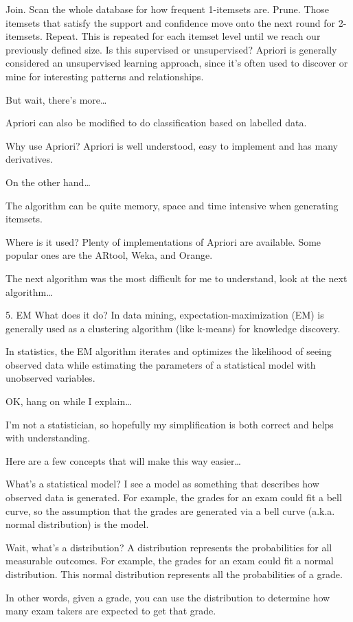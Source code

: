Join. Scan the whole database for how frequent 1-itemsets are.
Prune. Those itemsets that satisfy the support and confidence move onto the next round for 2-itemsets.
Repeat. This is repeated for each itemset level until we reach our previously defined size.
Is this supervised or unsupervised? Apriori is generally considered an unsupervised learning approach, since it’s often used to discover or mine for interesting patterns and relationships.

But wait, there’s more…

Apriori can also be modified to do classification based on labelled data.

Why use Apriori? Apriori is well understood, easy to implement and has many derivatives.

On the other hand…

The algorithm can be quite memory, space and time intensive when generating itemsets.

Where is it used? Plenty of implementations of Apriori are available. Some popular ones are the ARtool, Weka, and Orange.

The next algorithm was the most difficult for me to understand, look at the next algorithm…

5. EM
What does it do? In data mining, expectation-maximization (EM) is generally used as a clustering algorithm (like k-means) for knowledge discovery.

In statistics, the EM algorithm iterates and optimizes the likelihood of seeing observed data while estimating the parameters of a statistical model with unobserved variables.

OK, hang on while I explain…

I’m not a statistician, so hopefully my simplification is both correct and helps with understanding.

Here are a few concepts that will make this way easier…

What’s a statistical model? I see a model as something that describes how observed data is generated. For example, the grades for an exam could fit a bell curve, so the assumption that the grades are generated via a bell curve (a.k.a. normal distribution) is the model.

Wait, what’s a distribution? A distribution represents the probabilities for all measurable outcomes. For example, the grades for an exam could fit a normal distribution. This normal distribution represents all the probabilities of a grade.

In other words, given a grade, you can use the distribution to determine how many exam takers are expected to get that grade.

